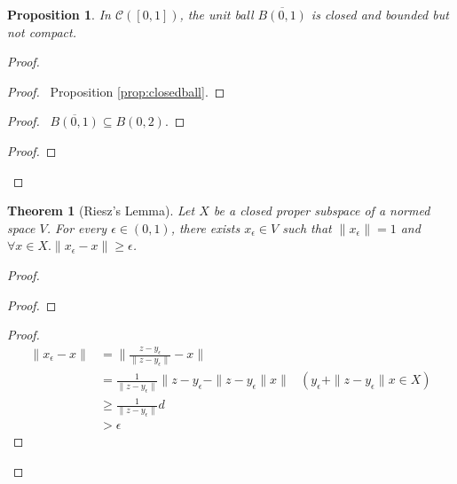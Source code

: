 \documentclass{book}
\let\qed\relax
\newtheorem{prop}[ax]{Proposition}
\newtheorem{thm}[ax]{Theorem}
\theoremstyle{definition}
\begin{document}
\begin{prop}
In $\mathcal{C}([0,1])$, the unit ball $\overline{B(0,1)}$ is closed and bounded but not compact.
\end{prop}

\begin{proof}
\pf
{}
\begin{proof}
	\pf\ Proposition \ref{prop:closedball}.
\end{proof}
\begin{proof}
	\pf\ $\overline{B(0,1)} \subseteq B(0,2)$.
\end{proof}
\begin{proof}
\end{proof}
\qed
\end{proof}

\begin{thm}[Riesz's Lemma]
Let $X$ be a closed proper subspace of a normed space $V$. For every $\epsilon \in (0,1)$, there exists $x_\epsilon \in V$ such that $\| x_\epsilon \| = 1$ and $\forall x \in X. \| x_\epsilon - x \| \geq \epsilon$.
\end{thm}

\begin{proof}
\pf
{}
\begin{proof}
\end{proof}
\begin{proof}
	\pf
	\begin{align*}
		\| x_\epsilon - x \| & =
		\| \frac{z - y_\epsilon}{\|z - y_\epsilon\|} - x \| \\
		& = \frac{1}{\| z - y_\epsilon \|} \| z - y_\epsilon - \| z - y_\epsilon \| x \| & (y_\epsilon + \| z - y_\epsilon \| x \in X) \\
		& \geq \frac{1}{\| z - y_\epsilon \|} d \\
		& > \epsilon
	\end{align*}
\end{proof}
\qed
\end{proof}
\end{document}
